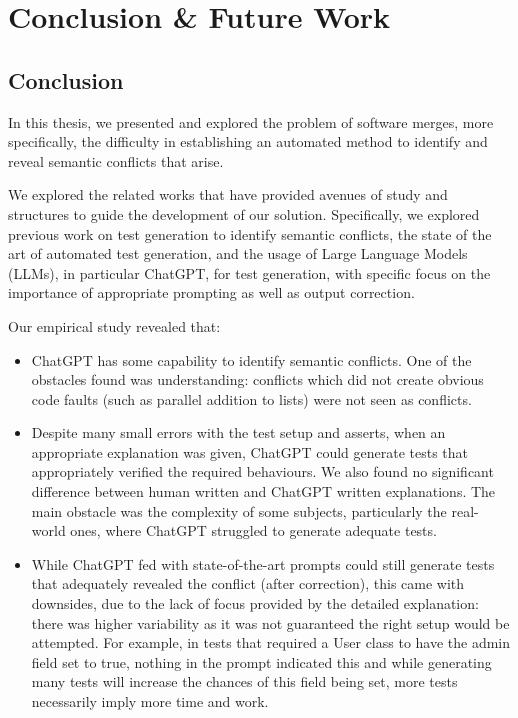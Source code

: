 \chapter{Conclusion \& Future Work}\label{chap:conclusion}

\section{Conclusion}

In this thesis, we presented and explored the problem of software merges, more specifically, the difficulty in establishing an automated method to identify and reveal semantic conflicts that arise.

We explored the related works that have provided avenues of study and structures to guide the development of our solution. Specifically, we explored previous work on test generation to identify semantic conflicts, the state of the art of automated test generation, and the usage of Large Language Models (LLMs), in particular ChatGPT, for test generation, with specific focus on the importance of appropriate prompting as well as output correction.

Our empirical study revealed that:
%
\begin{itemize}
  \item %
  ChatGPT has some capability to identify semantic conflicts. One of the obstacles found was understanding:
conflicts which did not create obvious code faults (such as parallel addition to lists) were not seen as conflicts. 

  \item %
  Despite many small errors with the test setup and asserts, when an appropriate explanation was given, ChatGPT could generate
tests that appropriately verified the required behaviours. We also found no significant difference between human written and ChatGPT written explanations. The main obstacle
was the complexity of some subjects, particularly the real-world ones, where ChatGPT struggled to generate adequate tests.

  \item %
  While ChatGPT fed with state-of-the-art prompts could still generate tests that adequately revealed the conflict (after correction),
this came with downsides, due to the lack of focus provided by the detailed explanation: there was higher variability as it was not guaranteed the right setup would be attempted.
For example, in tests that required a User class to have the admin field set to true, nothing in the prompt indicated this and while generating many tests will increase the chances
of this field being set, more tests necessarily imply more time and work.
\end{itemize}

